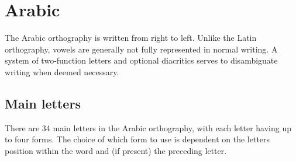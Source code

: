 \section{Arabic}

The Arabic orthography is written from right to left.
Unlike the Latin orthography, vowels are generally not fully represented in normal writing.
A system of two-function letters and optional diacritics serves to disambiguate writing when deemed necessary.

\subsection{Main letters}

There are 34 main letters in the Arabic orthography, with each letter having up to four forms.
The choice of which form to use is dependent on the letter\apostrophe{}s position within the word and (if present) the preceding letter.

